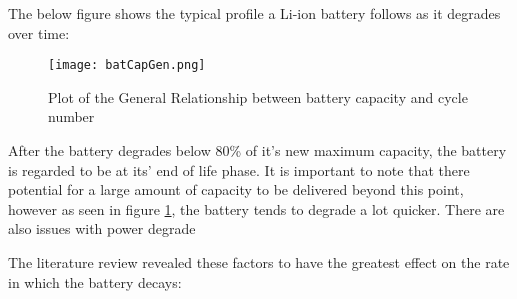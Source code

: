 The below figure shows the typical profile a Li-ion battery follows as
it degrades over time:

\begin{figure}[H]
  \centering
  \texttt{[image: batCapGen.png]}
  \caption{Plot of the General Relationship between battery capacity and cycle number \cite{spotnitz2003simulation} }
  \label{batCapGen}
\end{figure}

After the battery degrades below 80\% of it's new maximum capacity, the
battery is regarded to be at its' end of life phase. It is important to
note that there potential for a large amount of capacity to be delivered
beyond this point, however as seen in figure \ref{batCapGen}, the
battery tends to degrade a lot quicker. There are also issues with power
degrade

The literature review revealed these factors to have the greatest effect
on the rate in which the battery decays:


